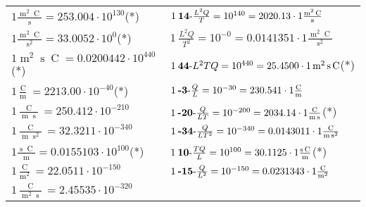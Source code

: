 \begin{center}
\begin{longtable}{l l}
{\color{black}$1 \bm{\mathrm{ }}\frac{\operatorname{m}^2\operatorname{C}}{\operatorname{s}} = 253.004\cdot10^{130} $}\quad(*)&
	{\color{black}$1\:\text{\textbf{14}-} \frac{L^2Q}{T}=10^{140} = 2020.13 \cdot 1 \bm{\mathrm{ }}\frac{\operatorname{m}^2\operatorname{C}}{\operatorname{s}}$}\\
{\color{black}$1 \bm{\mathrm{ }}\frac{\operatorname{m}^2\operatorname{C}}{\operatorname{s}^2} = 33.0052\cdot10^{0} $}\quad(*)&
	{\color{black}$1\:\text{} \frac{L^2Q}{T^2}=10^{-0} = 0.0141351 \cdot 1 \bm{\mathrm{ }}\frac{\operatorname{m}^2\operatorname{C}}{\operatorname{s}^2}$}\\
{\color{black}$1 \bm{\mathrm{ }}\operatorname{m}^2\operatorname{s}\operatorname{C} = 0.0200442\cdot10^{440} $}\quad(*)&
	{\color{black}$1\:\text{\textbf{44}-} L^2TQ=10^{440} = 25.4500 \cdot 1 \bm{\mathrm{ }}\operatorname{m}^2\operatorname{s}\operatorname{C}$}\quad(*)\\
{\color{black}$1 \bm{\mathrm{ }}\frac{\operatorname{C}}{\operatorname{m}} = 2213.00\cdot10^{-40} $}\quad(*)&
	{\color{black}$1\:\text{\textbf{-3}-} \frac{Q}{L}=10^{-30} = 230.541 \cdot 1 \bm{\mathrm{ }}\frac{\operatorname{C}}{\operatorname{m}}$}\\
{\color{black}$1 \bm{\mathrm{ }}\frac{\operatorname{C}}{\operatorname{m}\operatorname{s}} = 250.412\cdot10^{-210} $}&
	{\color{black}$1\:\text{\textbf{-20}-} \frac{Q}{LT}=10^{-200} = 2034.14 \cdot 1 \bm{\mathrm{ }}\frac{\operatorname{C}}{\operatorname{m}\operatorname{s}}$}\quad(*)\\
{\color{black}$1 \bm{\mathrm{ }}\frac{\operatorname{C}}{\operatorname{m}\operatorname{s}^2} = 32.3211\cdot10^{-340} $}&
	{\color{black}$1\:\text{\textbf{-34}-} \frac{Q}{LT^2}=10^{-340} = 0.0143011 \cdot 1 \bm{\mathrm{ }}\frac{\operatorname{C}}{\operatorname{m}\operatorname{s}^2}$}\\
{\color{black}$1 \bm{\mathrm{ }}\frac{\operatorname{s}\operatorname{C}}{\operatorname{m}} = 0.0155103\cdot10^{100} $}\quad(*)&
	{\color{black}$1\:\text{\textbf{10}-} \frac{TQ}{L}=10^{100} = 30.1125 \cdot 1 \bm{\mathrm{ }}\frac{\operatorname{s}\operatorname{C}}{\operatorname{m}}$}\quad(*)\\
{\color{black}$1 \bm{\mathrm{ }}\frac{\operatorname{C}}{\operatorname{m}^2} = 22.0511\cdot10^{-150} $}&
	{\color{black}$1\:\text{\textbf{-15}-} \frac{Q}{L^2}=10^{-150} = 0.0231343 \cdot 1 \bm{\mathrm{ }}\frac{\operatorname{C}}{\operatorname{m}^2}$}\\
{\color{black}$1 \bm{\mathrm{ }}\frac{\operatorname{C}}{\operatorname{m}^2\operatorname{s}} = 2.45535\cdot10^{-320} $}&

\end{longtable}
\end{center}
